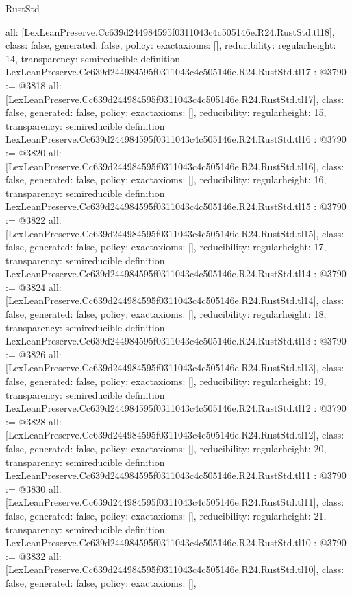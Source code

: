 \begin{lexlean}{RustStd}
\begin{coremodule}
{  all: [LexLeanPreserve.Cc639d244984595f0311043c4c505146e.R24.RustStd.tl18],
  class: false,
  generated: false,
  policy: exact{axioms: []},
  reducibility: regular{height: 14},
  transparency: semireducible
}
definition LexLeanPreserve.Cc639d244984595f0311043c4c505146e.R24.RustStd.tl17 : @3790 := @3818 {
  all: [LexLeanPreserve.Cc639d244984595f0311043c4c505146e.R24.RustStd.tl17],
  class: false,
  generated: false,
  policy: exact{axioms: []},
  reducibility: regular{height: 15},
  transparency: semireducible
}
definition LexLeanPreserve.Cc639d244984595f0311043c4c505146e.R24.RustStd.tl16 : @3790 := @3820 {
  all: [LexLeanPreserve.Cc639d244984595f0311043c4c505146e.R24.RustStd.tl16],
  class: false,
  generated: false,
  policy: exact{axioms: []},
  reducibility: regular{height: 16},
  transparency: semireducible
}
definition LexLeanPreserve.Cc639d244984595f0311043c4c505146e.R24.RustStd.tl15 : @3790 := @3822 {
  all: [LexLeanPreserve.Cc639d244984595f0311043c4c505146e.R24.RustStd.tl15],
  class: false,
  generated: false,
  policy: exact{axioms: []},
  reducibility: regular{height: 17},
  transparency: semireducible
}
definition LexLeanPreserve.Cc639d244984595f0311043c4c505146e.R24.RustStd.tl14 : @3790 := @3824 {
  all: [LexLeanPreserve.Cc639d244984595f0311043c4c505146e.R24.RustStd.tl14],
  class: false,
  generated: false,
  policy: exact{axioms: []},
  reducibility: regular{height: 18},
  transparency: semireducible
}
definition LexLeanPreserve.Cc639d244984595f0311043c4c505146e.R24.RustStd.tl13 : @3790 := @3826 {
  all: [LexLeanPreserve.Cc639d244984595f0311043c4c505146e.R24.RustStd.tl13],
  class: false,
  generated: false,
  policy: exact{axioms: []},
  reducibility: regular{height: 19},
  transparency: semireducible
}
definition LexLeanPreserve.Cc639d244984595f0311043c4c505146e.R24.RustStd.tl12 : @3790 := @3828 {
  all: [LexLeanPreserve.Cc639d244984595f0311043c4c505146e.R24.RustStd.tl12],
  class: false,
  generated: false,
  policy: exact{axioms: []},
  reducibility: regular{height: 20},
  transparency: semireducible
}
definition LexLeanPreserve.Cc639d244984595f0311043c4c505146e.R24.RustStd.tl11 : @3790 := @3830 {
  all: [LexLeanPreserve.Cc639d244984595f0311043c4c505146e.R24.RustStd.tl11],
  class: false,
  generated: false,
  policy: exact{axioms: []},
  reducibility: regular{height: 21},
  transparency: semireducible
}
definition LexLeanPreserve.Cc639d244984595f0311043c4c505146e.R24.RustStd.tl10 : @3790 := @3832 {
  all: [LexLeanPreserve.Cc639d244984595f0311043c4c505146e.R24.RustStd.tl10],
  class: false,
  generated: false,
  policy: exact{axioms: []},
}
\end{coremodule}
\end{lexlean}
